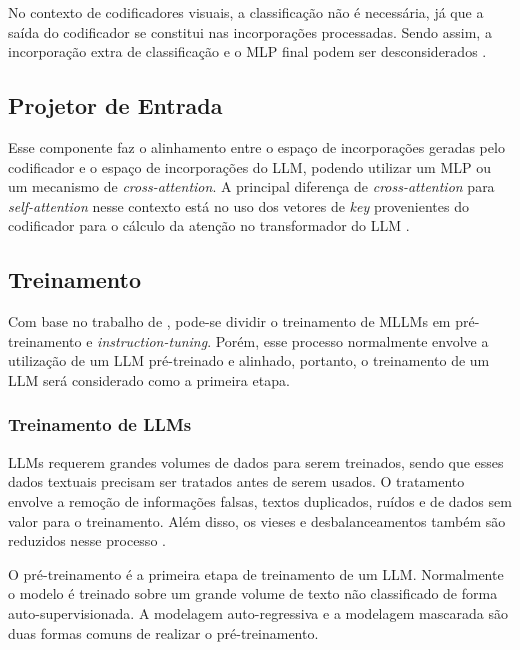 No contexto de codificadores visuais, a classificação não é necessária, já que a saída do codificador se constitui nas
incorporações processadas. Sendo assim, a incorporação extra de classificação e o \ac{MLP} final podem ser
desconsiderados \cite{dubey2024llama}.

\subsection{Projetor de Entrada}

Esse componente faz o alinhamento entre o espaço de incorporações geradas pelo codificador e o espaço de incorporações
do \ac{LLM}, podendo utilizar um \ac{MLP} ou um mecanismo de \textit{cross-attention}. A principal diferença de
\textit{cross-attention} para \textit{self-attention} nesse contexto está no uso dos vetores de \textit{key}
provenientes do codificador para o cálculo da atenção no transformador do \ac{LLM} \cite{mllm_survey_2024}.

\subsection{Treinamento}

Com base no trabalho de \textcite{mllm_survey_2024}, pode-se dividir o treinamento de \acp{MLLM} em pré-treinamento e
\textit{instruction-tuning}. Porém, esse processo normalmente envolve a utilização de um \ac{LLM} pré-treinado e
alinhado, portanto, o treinamento de um \ac{LLM} será considerado como a primeira etapa.

\subsubsection{Treinamento de LLMs}

\acp{LLM} requerem grandes volumes de dados para serem treinados, sendo que esses dados textuais precisam ser tratados
antes de serem usados. O tratamento envolve a remoção de informações falsas, textos duplicados, ruídos e de dados sem
valor para o treinamento. Além disso, os vieses e desbalanceamentos também são reduzidos nesse processo
\cite{llm_survey_2024}.


O pré-treinamento é a primeira etapa de treinamento de um \ac{LLM}. Normalmente o modelo é treinado sobre um grande
volume de texto não classificado de forma auto-supervisionada. A modelagem auto-regressiva e a modelagem mascarada são
duas formas comuns de realizar o pré-treinamento.

